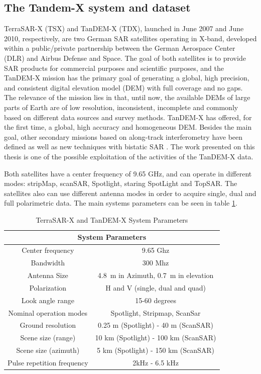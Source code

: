 \subsection{The Tandem-X system and dataset}
TerraSAR-X (TSX) and TanDEM-X (TDX), launched in June 2007 and June 2010,
respectively, are two German SAR satellites operating in X-band, developed within a
public/private partnership between the German Aerospace Center (DLR) and Airbus
Defense and Space.
The goal of both satellites is to provide SAR products for commercial purposes and
scientific purposes, and the TanDEM-X mission has the primary goal of generating a global,
high precision, and consistent digital elevation model (DEM) with full coverage and no
gaps. The relevance of the mission lies in that, until now, the available DEMs of large
parts of Earth are of low resolution, inconsistent, incomplete and commonly based on
different data sources and survey methods.
TanDEM-X has offered, for the first time, a global, high accuracy and homogeneous DEM.
Besides the main goal, other secondary missions based on along-track interferometry have
been defined as well as new techniques with bistatic SAR \cite{Alberto}. The work presented on this thesis is one of the
possible exploitation of the activities of the TanDEM-X data.

Both satellites have a center frequency of 9.65 GHz, and can operate in different modes: stripMap, scanSAR, Spotlight, staring SpotLight and TopSAR. The satellites also can use different antenna modes in order to acquire single, dual and full polarimetric data. The main systems parameters can be seen in table \ref{tab:tandem_params}.

\begin{table}[h]
    \centering
    \begin{tabular}{|c|c|}
        \hline 
        \multicolumn{2}{|c|}{System Parameters} \\ 
        \hline \hline
        Center frequency & 9.65 Ghz  \\ \hline
        Bandwidth & 300 Mhz  \\ \hline
        Antenna Size & 4.8 m in Azimuth, 0.7 m in elevation  \\ \hline
        Polarization & H and V (single, dual and quad)  \\ \hline
        Look angle range & 15-60 degrees  \\ \hline
        Nominal operation modes & Spotlight, Stripmap, ScanSar  \\ \hline
        Ground resolution & 0.25 m (Spotlight) - 40 m (ScanSAR) \\ \hline
        Scene size (range) & 10 km (Spotlight) - 100 km (ScanSAR)  \\ \hline
        Scene size (azimuth) & 5 km (Spotlight) - 150 km (ScanSAR)  \\ \hline
        Pulse repetition frequency & 2kHz - 6.5 kHz \\ \hline
    \end{tabular}
    \caption{TerraSAR-X and TanDEM-X System Parameters}
    \label{tab:tandem_params}
\end{table}

